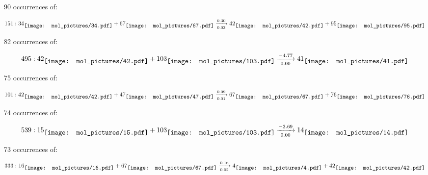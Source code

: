 \documentclass{article}
\begin{document}
\vspace{1cm}


90 occurrences of:

$$
151:  
34
\raisebox{-.5\height}{\texttt{[image: mol\_pictures/34.pdf]}}
+
67
\raisebox{-.5\height}{\texttt{[image: mol\_pictures/67.pdf]}}
\xrightarrow[0.03]{0.30}
42
\raisebox{-.5\height}{\texttt{[image: mol\_pictures/42.pdf]}}
+
95
\raisebox{-.5\height}{\texttt{[image: mol\_pictures/95.pdf]}}
$$



\vspace{1cm}


82 occurrences of:

$$
495:  
42
\raisebox{-.5\height}{\texttt{[image: mol\_pictures/42.pdf]}}
+
103
\raisebox{-.5\height}{\texttt{[image: mol\_pictures/103.pdf]}}
\xrightarrow[0.00]{-4.77}
41
\raisebox{-.5\height}{\texttt{[image: mol\_pictures/41.pdf]}}
$$



\vspace{1cm}


75 occurrences of:

$$
101:  
42
\raisebox{-.5\height}{\texttt{[image: mol\_pictures/42.pdf]}}
+
47
\raisebox{-.5\height}{\texttt{[image: mol\_pictures/47.pdf]}}
\xrightarrow[0.01]{0.09}
67
\raisebox{-.5\height}{\texttt{[image: mol\_pictures/67.pdf]}}
+
76
\raisebox{-.5\height}{\texttt{[image: mol\_pictures/76.pdf]}}
$$



\vspace{1cm}


74 occurrences of:

$$
539:  
15
\raisebox{-.5\height}{\texttt{[image: mol\_pictures/15.pdf]}}
+
103
\raisebox{-.5\height}{\texttt{[image: mol\_pictures/103.pdf]}}
\xrightarrow[0.00]{-3.69}
14
\raisebox{-.5\height}{\texttt{[image: mol\_pictures/14.pdf]}}
$$



\vspace{1cm}


73 occurrences of:

$$
333:  
16
\raisebox{-.5\height}{\texttt{[image: mol\_pictures/16.pdf]}}
+
67
\raisebox{-.5\height}{\texttt{[image: mol\_pictures/67.pdf]}}
\xrightarrow[0.02]{0.16}
4
\raisebox{-.5\height}{\texttt{[image: mol\_pictures/4.pdf]}}
+
42
\raisebox{-.5\height}{\texttt{[image: mol\_pictures/42.pdf]}}
$$
\end{document}
